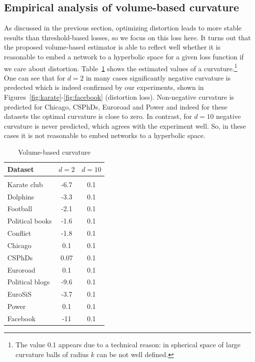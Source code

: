 \documentclass{article} %
\begin{document}
\subsection{Empirical analysis of volume-based curvature}\label{sec:volume_empirical}

As discussed in the previous section, optimizing distortion leads to more stable results than threshold-based losses, so we focus on this loss here. It turns out that the proposed volume-based estimator is able to reflect well whether it is reasonable to embed a network to a hyperbolic space for a given loss function if we care about distortion. Table~\ref{tab:volume-based} shows the estimated values of a curvature.\footnote{The value 0.1 appears due to a technical reason: in spherical space of large curvature balls of radius $k$ can be not well defined.} 
One can see that for $d = 2$ in many cases significantly negative curvature is predected which is indeed confirmed by our experiments, shown in Figures~\ref{fig:karate}-\ref{fig:facebook} (distortion loss). Non-negative curvature is predicted for Chicago, CSPhDs, Euroroad and Power and indeed for these datasets the optimal curvature is close to zero. In contrast, for $d = 10$ negative curvature is never predicted, which agrees with the experiment well. So, in these cases it is not reasonable to embed networks to a hyperbolic space.

\begin{table}[t]
\caption{Volume-based curvature}
\label{tab:volume-based}
\begin{center}
\begin{tabular}{lcc}
Dataset & $d = 2$ & $d = 10$ \\
 \hline \\
Karate club & -6.7 & 0.1 \\
Dolphins & -3.3 & 0.1 \\
Football & -2.1 & 0.1 \\
Political books & -1.6 & 0.1 \\
Conflict & -1.8 & 0.1 \\
Chicago & 0.1 & 0.1 \\
CSPhDs & 0.07 & 0.1 \\
Euroroad & 0.1 & 0.1 \\
Political blogs & -9.6 & 0.1 \\
EuroSiS & -3.7 & 0.1 \\
Power & 0.1 & 0.1 \\
Facebook & -11 & 0.1 \\
\end{tabular}
\end{center}
\end{table}
\end{document}
